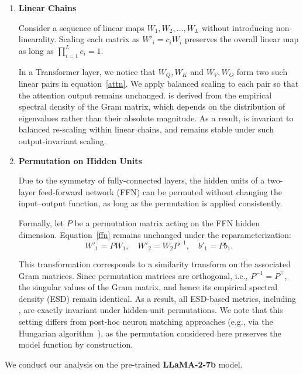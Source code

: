 \begin{enumerate}
    \item  \textbf{Linear Chains}
    
Consider a sequence of linear maps $W_1, W_2, \dots, W_L$ without introducing non-linearality. Scaling each matrix as $W'_i = c_i W_i$ preserves the overall linear map as long as $\prod_{i=1}^Lc_i = 1$.

In a Transformer layer, we notice that $W_Q, W_K$ and $W_V, W_O$ form two such linear pairs in equation~\ref{attn}. We apply balanced scaling to each pair so that the attention output remains unchanged.
\ALPHAHILL is derived from the empirical spectral density of the Gram matrix, which depends on the distribution of eigenvalues rather than their absolute magnitude. As a result, \ALPHAHILL is invariant to balanced re-scaling within linear chains, and remains stable under such output-invariant scaling.

\item \textbf{Permutation on Hidden Units}

Due to the symmetry of fully-connected layers, the hidden units of a two-layer
feed-forward network (FFN) can be permuted without changing the input–output function, as long as the permutation is applied consistently.

Formally, let $P$ be a permutation matrix acting on the FFN hidden dimension. Equation~\ref{ffn} remains unchanged under the reparameterization:
\[
W'_1 = P W_1, \quad
W'_2 = W_2 P^{-1}, \quad
b'_1 = P b_1 .
\]

This transformation corresponds to a similarity transform on the associated Gram matrices.
Since permutation matrices are orthogonal, i.e., $P^{-1} = P^\top$, the singular values of the Gram matrix, and hence its empirical spectral density (ESD) remain identical.
As a result, all ESD-based metrics, including \ALPHAHILL, are exactly invariant under hidden-unit permutations.
We note that this setting differs from post-hoc neuron matching approaches (e.g., via the Hungarian algorithm~\cite{zhu2025independence}), as the permutation considered here preserves the model function by construction.

\end{enumerate}
We conduct our analysis on the pre-trained \textbf{LLaMA-2-7b} model. 
